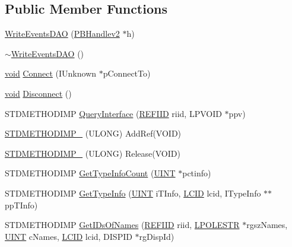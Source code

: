 \subsection*{Public Member Functions}
\begin{DoxyCompactItemize}
\item 
\hyperlink{class_write_events_d_a_o_ae5d026182ad3ae2e47acf1510e5de63d}{Write\+Events\+D\+AO} (\hyperlink{struct_p_b_handlev2}{P\+B\+Handlev2} $\ast$h)
\item 
\hyperlink{class_write_events_d_a_o_a0ecda262cd8dea384226919a4becaf43}{$\sim$\+Write\+Events\+D\+AO} ()
\item 
\hyperlink{sound_8c_ae35f5844602719cf66324f4de2a658b3}{void} \hyperlink{class_write_events_d_a_o_a8f0b59788245b83a4ffb9402a8a98105}{Connect} (I\+Unknown $\ast$p\+Connect\+To)
\item 
\hyperlink{sound_8c_ae35f5844602719cf66324f4de2a658b3}{void} \hyperlink{class_write_events_d_a_o_a41033d9149bf59bec710aa17c0cdbe36}{Disconnect} ()
\item 
S\+T\+D\+M\+E\+T\+H\+O\+D\+I\+MP \hyperlink{class_write_events_d_a_o_a8ead170dd092143aa73fab7d5eb1230e}{Query\+Interface} (\hyperlink{px__win__ds_8c_a80ec49c8ae61e234197d5071d2df497d}{R\+E\+F\+I\+ID} riid, L\+P\+V\+O\+ID $\ast$ppv)
\item 
\hyperlink{class_write_events_d_a_o_a80f4dcc0828b8ffd3dd3ef3abcd2ff80}{S\+T\+D\+M\+E\+T\+H\+O\+D\+I\+M\+P\+\_\+} (U\+L\+O\+NG) Add\+Ref(V\+O\+ID)
\item 
\hyperlink{class_write_events_d_a_o_a0e528458dc078e45c6a0b4cefc943098}{S\+T\+D\+M\+E\+T\+H\+O\+D\+I\+M\+P\+\_\+} (U\+L\+O\+NG) Release(V\+O\+ID)
\item 
S\+T\+D\+M\+E\+T\+H\+O\+D\+I\+MP \hyperlink{class_write_events_d_a_o_ab734875b1f1d2c048cdd6d0cad1e8a2a}{Get\+Type\+Info\+Count} (\hyperlink{mapinls_8h_a36cb3b01d81ffd844bbbfb54003e06ec}{U\+I\+NT} $\ast$pctinfo)
\item 
S\+T\+D\+M\+E\+T\+H\+O\+D\+I\+MP \hyperlink{class_write_events_d_a_o_aa49a8a2ab0600136d108d2f712ca14f7}{Get\+Type\+Info} (\hyperlink{mapinls_8h_a36cb3b01d81ffd844bbbfb54003e06ec}{U\+I\+NT} i\+T\+Info, \hyperlink{mapinls_8h_aad243bba501745d51f6a670ade640986}{L\+C\+ID} lcid, I\+Type\+Info $\ast$$\ast$pp\+T\+Info)
\item 
S\+T\+D\+M\+E\+T\+H\+O\+D\+I\+MP \hyperlink{class_write_events_d_a_o_ad05df69952e59e26556bc1914b08c692}{Get\+I\+Ds\+Of\+Names} (\hyperlink{px__win__ds_8c_a80ec49c8ae61e234197d5071d2df497d}{R\+E\+F\+I\+ID} riid, \hyperlink{mapinls_8h_a7bf421fbb1651000d29827aa4e1a1d7f}{L\+P\+O\+L\+E\+S\+TR} $\ast$rgsz\+Names, \hyperlink{mapinls_8h_a36cb3b01d81ffd844bbbfb54003e06ec}{U\+I\+NT} c\+Names, \hyperlink{mapinls_8h_aad243bba501745d51f6a670ade640986}{L\+C\+ID} lcid, D\+I\+S\+P\+ID $\ast$rg\+Disp\+Id)
$$
\end{DoxyCompactItemize}
